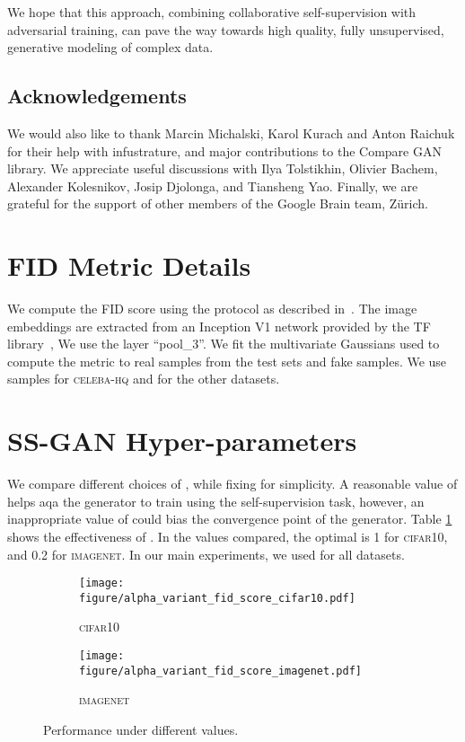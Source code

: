 \documentclass[10pt,twocolumn,letterpaper]{article}
\newcommand{\celebahq}{\textsc{celeba-hq}}
\newcommand{\cifar}{\textsc{cifar10}}
\newcommand{\imagenet}{\textsc{imagenet}}
\begin{document}
We hope that this approach, combining collaborative self-supervision with adversarial training, can pave the way towards high quality, fully unsupervised, generative modeling of complex data.
 \subsection*{Acknowledgements}

We would also like to thank Marcin Michalski, Karol Kurach and Anton Raichuk for their help with infustrature, and major contributions to the Compare GAN library.
We appreciate useful discussions with Ilya Tolstikhin, Olivier Bachem, Alexander Kolesnikov, Josip Djolonga, and Tiansheng Yao.
Finally, we are grateful for the support of other members of the Google Brain team, Z\"{u}rich.
 
{\small


}

\clearpage
\appendix
\section{FID Metric Details}

We compute the FID score using the protocol as described in~\citep{heusel2017gans}.
The image embeddings are extracted from an Inception V1 network provided by the TF library~\citep{tfgan2017},
We use the layer ``pool\_3''.
We fit the multivariate Gaussians used to compute the metric to real samples from the test sets and fake samples.
We use  samples for \celebahq{} and  for the other datasets.


\section{SS-GAN Hyper-parameters}

We compare different choices of , while fixing  for simplicity.
A reasonable value of  helps                                                                                                                                              aqa the generator to train using the self-supervision task,
however, an inappropriate value of  could bias the convergence point of the generator.
Table \ref{fig:beta_variant} shows the effectiveness of .
In the values compared, the optimal  is 1 for \cifar{}, and 0.2 for \imagenet{}.
In our main experiments, we used  for all datasets.

\begin{figure}[h]
 \centering
\begin{subfigure}[b]{0.48\textwidth}
    \texttt{[image: figure/alpha\_variant\_fid\_score\_cifar10.pdf]}
    \caption{\cifar{}}
 \end{subfigure}
 \begin{subfigure}[b]{0.48\textwidth}
    \texttt{[image: figure/alpha\_variant\_fid\_score\_imagenet.pdf]}
    \caption{\imagenet{}}
 \end{subfigure}
 \caption{\label{fig:beta_variant} Performance under different  values.}
\end{figure}
\end{document}
